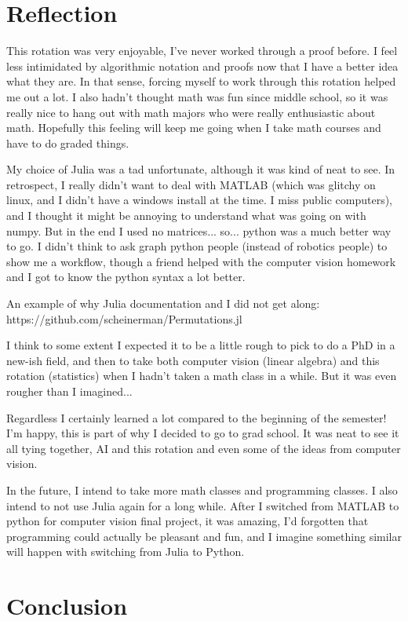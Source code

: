 \documentclass[a4paper]{article}
\begin{document}
{\section{Reflection}

This rotation was very enjoyable, I've never worked through a proof before. I
feel less intimidated by algorithmic notation and proofs now that I have a
better idea what they are. In that sense, forcing myself to work through this
rotation helped me out a lot. I also hadn't thought math was fun since middle
school, so it was really nice to hang out with math majors who were really
enthusiastic about math. Hopefully this feeling will keep me going when I take
math courses and have to do graded things.

My choice of Julia was a tad unfortunate, although it was kind of neat to see.
In retrospect, I really didn't want to deal with MATLAB (which was glitchy on
linux, and I didn't have a windows install at the time. I miss public
computers), and I thought it might be annoying to understand what was going on
with numpy. But in the end I used no matrices... so... python was a much better
way to go. I didn't think to ask graph python people (instead of robotics
people) to show me a workflow,
though a friend helped with the computer vision homework and I got to know the
python syntax a lot better.

An example of why Julia documentation and I did not get along:
https://github.com/scheinerman/Permutations.jl

I think to some extent I expected it to be a little rough to pick to do a PhD in a new-ish
field, and then to take both computer vision (linear algebra) and this rotation
(statistics) when I hadn't taken a math class in a while. But it was even
rougher than I imagined...

Regardless I certainly learned a lot compared to the beginning of the semester!
I'm happy, this is part of why I decided to go to grad school. It was
neat to see it all tying together, AI and this rotation and even some of the
ideas from computer vision.

In the future, I intend to take more math classes and programming classes. I
also intend to not use Julia again for a long while. After I switched from
MATLAB to python for computer vision final project, it was amazing, I'd
forgotten that programming could actually be pleasant and fun, and I imagine
something similar will happen with switching from Julia to Python.

\section{Conclusion}

}
\end{document}
